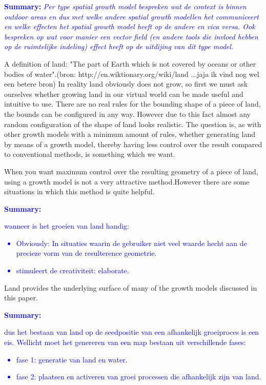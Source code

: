 \documentclass{article}
\newcommand{\inhoud}[1]{\textcolor{blue}{\textbf{\newline Summary: }\it{#1}}}
\begin{document}
\inhoud{Per type spatial growth model bespreken wat de context is binnen outdoor areas en dus met 
welke andere spatial growth modellen het communiceert en welke effecten het spatial growth model heeft 
op de andere en vica versa. Ook bespreken op wat voor manier een vector field (en andere tools 
die invloed hebben op de ruimtelijke indeling)  effect heeft op de uitdijing van dit type model.   
}

A definition of land: "The part of Earth which is not covered by oceans or other bodies of water".(bron: http://en.wiktionary.org/wiki/land ...jaja ik vind nog wel een betere bron)
In reality land obviously does not grow, so first we must ask ourselves whether growing land in our virtual world can be made useful and intuitive to use. There are no real rules for the bounding shape of a piece of land, the bounds can be configured in any way. However due to this fact almost any random configuration of the shape of land looks realistic. The question is, as with other growth models with a minimum amount of rules, whether generating land by means of a growth model, thereby having less control over the result compared to conventional methods, is something which we want. 

When you want maximum control over the resulting geometry of a piece of land, using a growth model is not a very attractive method.However there are some situations in which this method is quite helpful.

\inhoud
{wanneer is het groeien van land handig: 
\begin{itemize}
\item Obviously: In situaties waarin de gebruiker niet veel waarde hecht aan de precieze vorm van de resulterence geometrie.  
\item stimuleert de creativiteit: elaborate. 
\end{itemize}
}

Land provides the underlying surface of many of the growth models discussed in this paper. 

\inhoud
{dus het bestaan van land op de seedpositie van een afhankelijk groeiproces is een eis. Wellicht moet het genereren van een map bestaan uit verschillende fases:
\begin{itemize}
\item fase 1: generatie van land en water. 
\item fase 2: plaatsen en activeren van groei processen die afhankelijk zijn van land.  
\end{itemize}
}
\end{document}
